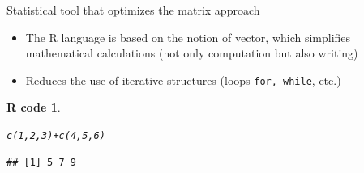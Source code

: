 \documentclass[11pt]{beamer}\usepackage[]{graphicx}\usepackage[]{color}
\makeatletter
\newcommand{\hlnum}[1]{\textcolor[rgb]{0.063,0.58,0.627}{#1}}%
\newcommand{\hlopt}[1]{\textcolor[rgb]{0.196,0.196,0.196}{#1}}%
\newcommand{\hlstd}[1]{\textcolor[rgb]{0.196,0.196,0.196}{#1}}%
\newcommand{\hlkwd}[1]{\textcolor[rgb]{0.78,0.227,0.412}{#1}}%
\newenvironment{kframe}{%
 \def\at@end@of@kframe{}%
 \ifinner\ifhmode%
  \def\at@end@of@kframe{\end{minipage}}%
  \begin{minipage}{\columnwidth}%
 \fi\fi%
 \def\FrameCommand##1{\hskip\@totalleftmargin \hskip-\fboxsep
 \colorbox{shadecolor}{##1}\hskip-\fboxsep
     \hskip-\linewidth \hskip-\@totalleftmargin \hskip\columnwidth}%
 \MakeFramed {\advance\hsize-\width
   \@totalleftmargin\z@ \linewidth\hsize
   \@setminipage}}%
 {\par\unskip\endMakeFramed%
 \at@end@of@kframe}
\newenvironment{knitrout}{}{} %
\newtheorem{rcode}{R code}[section]
\newcommand{\code}[1]{\texttt{#1}}
\makeatother
\begin{document}
\begin{frame}[fragile]{Statistical tool that optimizes the matrix approach}

\begin{itemize}
  \setlength\itemsep{2em}
\item The R language is based on the notion of vector, which simplifies mathematical calculations (not only computation but also writing)
\pause \item Reduces the use of iterative structures (loops \code{for, while}, etc.)
\end{itemize}
\pause 
\begin{knitrout}
\color{fgcolor}\begin{kframe}
\begin{rcode}\label{unnamed-chunk-1}\begin{alltt}
\hlkwd{c}\hlstd{(}\hlnum{1}\hlstd{,}\hlnum{2}\hlstd{,}\hlnum{3}\hlstd{)} \hlopt{+} \hlkwd{c}\hlstd{(}\hlnum{4}\hlstd{,}\hlnum{5}\hlstd{,}\hlnum{6}\hlstd{)}
\end{alltt}
\begin{verbatim}
## [1] 5 7 9
\end{verbatim}
\end{rcode}\end{kframe}
\end{knitrout}


\end{frame}
\end{document}
